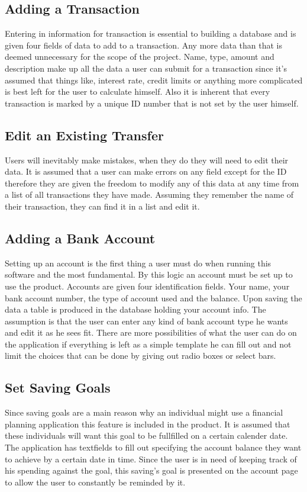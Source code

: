 \documentclass[12pt]{article}
\begin{document}
\subsection{Adding a Transaction}
	Entering in information for transaction is essential to building a database and is given four fields of data to add to a transaction. Any more data than that is deemed unnecessary for the scope of the project. Name, type, amount and description make up all the data a user can submit for a transaction since it's assumed that things like, interest rate, credit limits or anything more complicated is best left for the user to calculate himself. Also it is inherent that every transaction is marked by a unique ID number that is not set by the user himself.
\subsection{Edit an Existing Transfer}
	Users will inevitably make mistakes, when they do they will need to edit their data. It is assumed that a user can make errors on any field except for the ID therefore they are given the freedom to modify any of this data at any time from a list of all transactions they have made. Assuming they remember the name of their transaction, they can find it in a list and edit it. 
\subsection{Adding a Bank Account}
	Setting up an account is the first thing a user must do when running this software and the most fundamental. By this logic an account must be set up to use the product. Accounts are given four identification fields. Your name, your bank account number, the type of account used and the balance. Upon saving the data a table is produced in the database holding your account info. The assumption is that the user can enter any kind of bank account type he wants and edit it as he sees fit. There are more possibilities of what the user can do on the application if everything is left as a simple template he can fill out and not limit the choices that can be done by giving out radio boxes or select bars.
\subsection{Set Saving Goals}
	Since saving goals are a main reason why an individual might use a financial planning application this feature is included in the product. It is assumed that these individuals will want this goal to be fullfilled on a certain calender date. The application has textfields to fill out specifying the account balance they want to achieve by a certain date in time. Since the user is in need of keeping track of his spending against the goal, this saving's goal is presented on the account page to allow the user to constantly be reminded by it.
	
\end{document}
